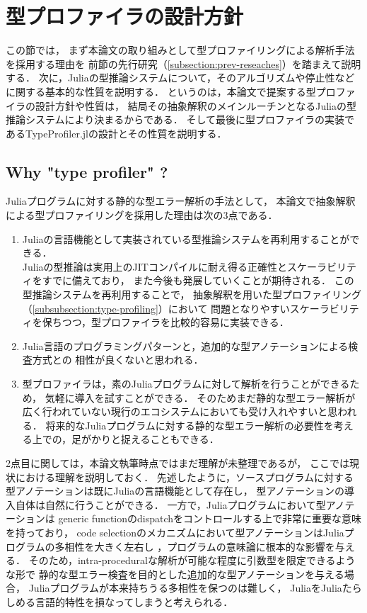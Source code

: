 
\section{型プロファイラの設計方針} \label{section:3}

この節では，
まず本論文の取り組みとして型プロファイリングによる解析手法を採用する理由を
前節の先行研究（\ref{subsection:prev-reseaches}）を踏まえて説明する．
次に，Juliaの型推論システムについて，そのアルゴリズムや停止性などに関する基本的な性質を説明する．
というのは，本論文で提案する型プロファイラの設計方針や性質は，
結局その抽象解釈のメインルーチンとなるJuliaの型推論システムにより決まるからである．
そして最後に型プロファイラの実装であるTypeProfiler.jlの設計とその性質を説明する．

\subsection{Why "type profiler" ?}

Juliaプログラムに対する静的な型エラー解析の手法として，
本論文で抽象解釈による型プロファイリングを採用した理由は次の3点である．

\begin{enumerate}
  \item Juliaの言語機能として実装されている型推論システムを再利用することができる．\\
        Juliaの型推論は実用上のJITコンパイルに耐え得る正確性とスケーラビリティをすでに備えており，
        また今後も発展していくことが期待される．
        この型推論システムを再利用することで，
        抽象解釈を用いた型プロファイリング（\ref{subsubsection:type-profiling}）において
        問題となりやすいスケーラビリティを保ちつつ，型プロファイラを比較的容易に実装できる．
　\item Julia言語のプログラミングパターンと，追加的な型アノテーションによる検査方式との
        相性が良くないと思われる．
  \item 型プロファイラは，素のJuliaプログラムに対して解析を行うことができるため，
        気軽に導入を試すことができる．
        そのためまだ静的な型エラー解析が広く行われていない現行のエコシステムにおいても受け入れやすいと思われる．
        将来的なJuliaプログラムに対する静的な型エラー解析の必要性を考える上での，足がかりと捉えることもできる．
\end{enumerate}

2点目に関しては，本論文執筆時点ではまだ理解が未整理であるが，
ここでは現状における理解を説明しておく．
先述したように，ソースプログラムに対する型アノテーションは既にJuliaの言語機能として存在し，
型アノテーションの導入自体は自然に行うことができる．
一方で，Juliaプログラムにおいて型アノテーションは
generic functionのdispatchをコントロールする上で非常に重要な意味を持っており，
code selectionのメカニズムにおいて型アノテーションはJuliaプログラムの多相性を大きく左右し\footnotemark
，プログラムの意味論に根本的な影響を与える．
そのため，intra-proceduralな解析が可能な程度に引数型を限定できるような形で
静的な型エラー検査を目的とした追加的な型アノテーションを与える場合，
Juliaプログラムが本来持ちうる多相性を保つのは難しく，
JuliaをJuliaたらしめる言語的特性を損なってしまうと考えられる．

